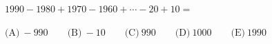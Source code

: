 $ 1990-1980+1970-1960+\cdots-20+10 = $



$ \text{(A)}\ -990\qquad\text{(B)}\ -10\qquad\text{(C)}\ 990\qquad\text{(D)}\ 1000\qquad\text{(E)}\ 1990 $
